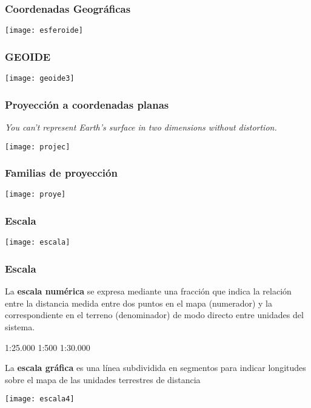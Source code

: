 \documentclass{beamer}
\begin{document}
\begin{frame}
\frametitle{Coordenadas Geográficas}
\begin{center}
   	\texttt{[image: esferoide]}
\end{center}
\end{frame}
\begin{frame}
\frametitle{GEOIDE}
\begin{center}
   	\texttt{[image: geoide3]}
\end{center}
\end{frame}
\begin{frame}
\frametitle{Proyección a coordenadas planas}
\small{\emph{You can’t represent Earth’s surface in two dimensions without distortion.}}
\begin{center}
   	\texttt{[image: projec]}
\end{center}
\end{frame}
\begin{frame}
\frametitle{Familias de proyección}
\begin{center}
   	\texttt{[image: proye]}
\end{center}
\end{frame}
\begin{frame}
\frametitle{Escala}
\begin{center}
   	\texttt{[image: escala]}
\end{center}
\end{frame}
\begin{frame}
\frametitle{Escala}
\small{La \textbf{escala numérica} se expresa mediante una fracción que indica la relación entre la distancia medida entre dos puntos en el mapa (numerador) y la correspondiente en el terreno (denominador) de modo directo entre unidades del sistema.}\\
\begin{center}
1:25.000
1:500
1:30.000
\end{center}
\small{La \textbf{escala gráfica} es una línea subdividida en segmentos para indicar longitudes sobre el mapa de las unidades terrestres de distancia}
\begin{center}
   	\texttt{[image: escala4]}
\end{center}
\end{frame}
\end{document}
